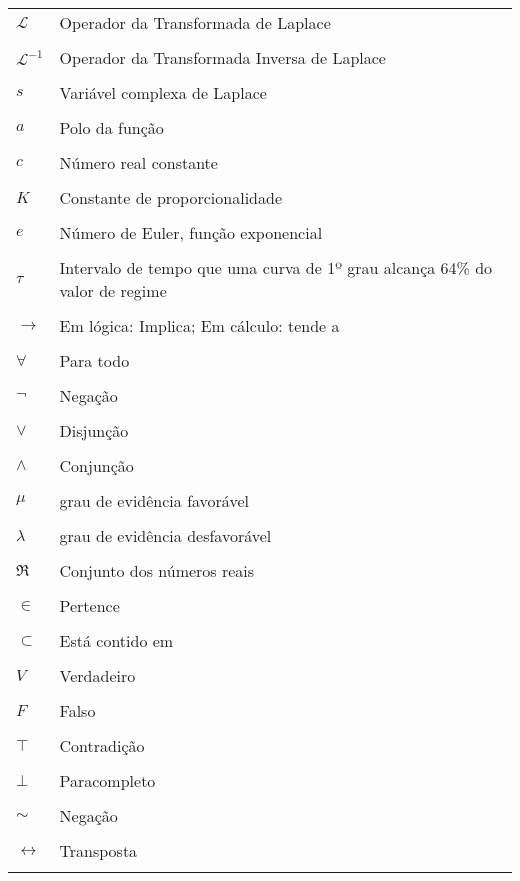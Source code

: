 \thispagestyle{empty}
\begin{longtable}[l]{p{50pt} p{300pt}}
  $\mathscr{L} $ & Operador da Transformada de Laplace \\ \\
  $\mathscr{L}^{-1}$ & Operador da Transformada Inversa de Laplace\\ \\
  $s$ & Variável complexa de Laplace\\ \\
  $a$ & Polo da função \\ \\
  $c$ & Número real constante\\ \\
  $K$ & Constante de proporcionalidade\\ \\
  $e$ & Número de Euler, função exponencial\\ \\
  $\tau$ & Intervalo de tempo que uma curva de 1º grau alcança 64\% do valor de regime\\ \\
  $\rightarrow$ & Em lógica: Implica; Em cálculo: tende a\\ \\
  $\forall$ & Para todo\\ \\
  $\neg$ & Negação\\ \\
  $\vee$ & Disjunção\\ \\
  $\wedge$ & Conjunção\\ \\
  $\mu $ & grau de evidência favorável \\ \\
  $\lambda $ & grau de evidência desfavorável \\ \\
  $\Re$ & Conjunto dos números reais\\ \\
  $\in$ & Pertence\\ \\
  $\subset$ & Está contido em\\ \\
  $V$ & Verdadeiro\\ \\
  $F$ & Falso\\ \\
  $\top$ & Contradição\\ \\
  $\bot$ & Paracompleto\\ \\
  $\sim$ & Negação\\ \\
  $\leftrightarrow$ & Transposta\\ \\
\end{longtable}
